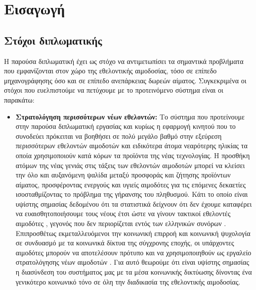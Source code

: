 \chapter{Εισαγωγή}\label{ch:intro}
\section{Στόχοι διπλωματικής}\label{sec:intro_goals}
Η παρούσα διπλωματική έχει ως στόχο να αντιμετωπίσει τα σημαντικά προβλήματα που εμφανίζονται στον χώρο της εθελοντικής αιμοδοσίας, τόσο σε επίπεδο μηχανογράφησης όσο και σε επίπεδο ανεπάρκειας δωρεών αίματος. Συγκεκριμένα οι στόχοι που ευελπιστούμε να πετύχουμε με το προτεινόμενο σύστημα είναι οι παρακάτω:
\begin{itemize}
	\item \textbf{Στρατολόγηση περισσότερων νέων εθελοντών:} Το σύστημα που προτείνουμε στην παρούσα διπλωματική εργασίας και κυρίως η εφαρμογή κινητού που το συνοδεύει πρόκειται να βοηθήσει σε πολύ μεγάλο βαθμό στην εξεύρεση περισσότερων εθελοντών αιμοδοτών και ειδικότερα άτομα νεαρότερης ηλικίας τα οποία χρησιμοποιούν κατά κόρων τα προϊόντα της νέας τεχνολογίας. Η προσθήκη ατόμων της νέας γενιάς στις τάξεις των εθελοντών αιμοδοτών μπορεί να κλείσει την όλο και αυξανόμενη ψαλίδα μεταξύ προσφοράς και ζήτησης προϊόντων αίματος, προσφέροντας ενεργούς και υγιείς αιμοδότες για τις επόμενες δεκαετίες ισοσταθμίζοντας το πρόβλημα της γήρανσης του πληθυσμού. Κάτι το οποίο είναι υψίστης σημασίας δεδομένου ότι τα στατιστικά δείχνουν ότι δεν έχουμε καταφέρει να ευαισθητοποιήσουμε τους νέους έτσι ώστε να γίνουν τακτικοί εθελοντές αιμοδότες \cite{Marantidou2007}, γεγονός που δεν περιορίζεται εντός των ελληνικών συνόρων \cite{Lemmens2005}. Επιπροσθέτως εκμεταλλευόμενοι την κοινωνική επιρροή και κοινωνική ψυχολογία σε συνδυασμό με τα κοινωνικά δίκτυα της σύγχρονης εποχής, οι υπάρχοντες αιμοδότες μπορούν να αποτελέσουν πρότυπο και να χρησιμοποιηθούν ως εργαλείο στρατολόγησης νέων αιμοδοτών \cite{Misje2005}. Για αυτό θεωρούμε ότι είναι υψίστης σημασίας η διασύνδεση του συστήματος μας με τα μέσα κοινωνικής δικτύωσης δίνοντας ένα γενικότερο κοινωνικό τόνο σε όλη την διαδικασία της εθελοντικής αιμοδοσίας.

\end{itemize}
